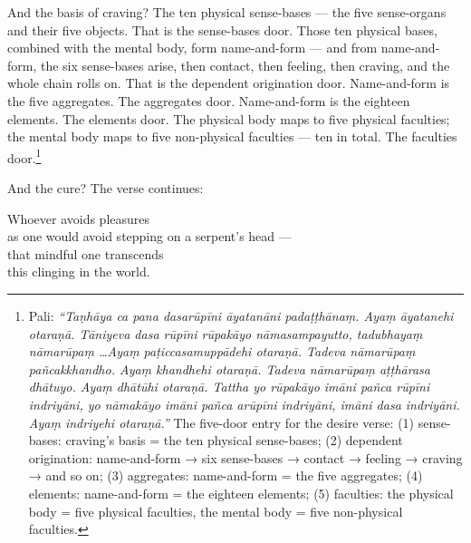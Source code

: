 And the basis of craving? The ten physical sense-bases --- the five sense-organs and their five objects. That is the sense-bases door. Those ten physical bases, combined with the mental body, form name-and-form --- and from name-and-form, the six sense-bases arise, then contact, then feeling, then craving, and the whole chain rolls on. That is the dependent origination door. Name-and-form is the five aggregates. The aggregates door. Name-and-form is the eighteen elements. The elements door. The physical body maps to five physical faculties; the mental body maps to five non-physical faculties --- ten in total. The faculties door.\footnote{Pali: \textit{``Taṇhāya ca pana dasarūpīni āyatanāni padaṭṭhānaṃ. Ayaṃ āyatanehi otaraṇā. Tāniyeva dasa rūpīni rūpakāyo nāmasampayutto, tadubhayaṃ nāmarūpaṃ \ldots Ayaṃ paṭiccasamuppādehi otaraṇā. Tadeva nāmarūpaṃ pañcakkhandho. Ayaṃ khandhehi otaraṇā. Tadeva nāmarūpaṃ aṭṭhārasa dhātuyo. Ayaṃ dhātūhi otaraṇā. Tattha yo rūpakāyo imāni pañca rūpīni indriyāni, yo nāmakāyo imāni pañca arūpīni indriyāni, imāni dasa indriyāni. Ayaṃ indriyehi otaraṇā.''} The five-door entry for the desire verse: (1) sense-bases: craving's basis = the ten physical sense-bases; (2) dependent origination: name-and-form → six sense-bases → contact → feeling → craving → and so on; (3) aggregates: name-and-form = the five aggregates; (4) elements: name-and-form = the eighteen elements; (5) faculties: the physical body = five physical faculties, the mental body = five non-physical faculties.}

And the cure? The verse continues:

\begin{versebox}
Whoever avoids pleasures\\
as one would avoid stepping on a serpent's head ---\\
that mindful one transcends\\
this clinging in the world.
\end{versebox}


